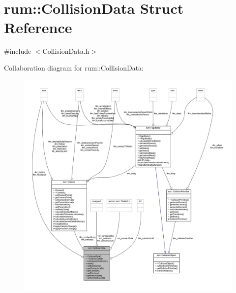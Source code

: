 \hypertarget{classrum_1_1_collision_data}{}\section{rum\+:\+:Collision\+Data Struct Reference}
\label{classrum_1_1_collision_data}


{\ttfamily \#include $<$Collision\+Data.\+h$>$}



Collaboration diagram for rum\+:\+:Collision\+Data\+:\nopagebreak
\begin{figure}[H]
\begin{center}
\leavevmode
\includegraphics[width=350pt]{classrum_1_1_collision_data__coll__graph}
\end{center}
\end{figure}
